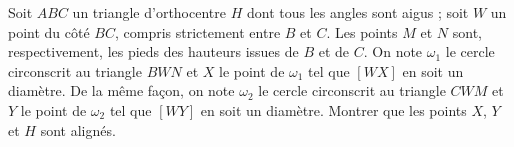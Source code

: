 Soit $ABC$ un triangle d'orthocentre $H$ dont tous les angles sont aigus ; soit $W$ un point du côté $BC$,
compris strictement entre $B$ et $C$. Les points $M$ et $N$ sont, respectivement, les pieds des hauteurs
issues de $B$ et de $C$. On note $\omega_1$ le cercle circonscrit au triangle $BWN$ et $X$ le point de
$\omega_1$ tel que $[WX]$ en soit un diamètre. De la même façon, on note $\omega_2$ le cercle circonscrit au
triangle $CWM$ et $Y$ le point de $\omega_2$ tel que $[WY]$ en soit un diamètre. Montrer que les points $X$,
$Y$ et $H$ sont alignés.
